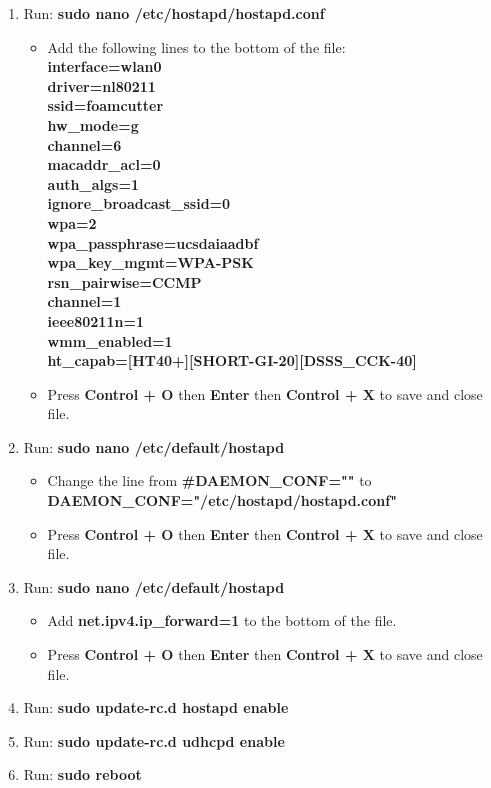 \documentclass[titlepage,12pt,letter]{report}
\numberwithin{equation}{chapter}
\begin{document}
\begin{enumerate}[itemsep = 5pt,topsep=0pt]
	\item Run: \textbf{sudo nano /etc/hostapd/hostapd.conf}
	\begin{itemize}[noitemsep,topsep=0pt]
		\item Add the following lines to the bottom of the file:\\
		\textbf{interface=wlan0} \\
		\textbf{driver=nl80211}\\
		\textbf{ssid=foamcutter}\\
		\textbf{hw\_mode=g}\\
		\textbf{channel=6}\\
		\textbf{macaddr\_acl=0}\\
		\textbf{auth\_algs=1}\\
		\textbf{ignore\_broadcast\_ssid=0}\\
		\textbf{wpa=2}\\
		\textbf{wpa\_passphrase=ucsdaiaadbf}\\
		\textbf{wpa\_key\_mgmt=WPA-PSK} \\   
		\textbf{rsn\_pairwise=CCMP}\\
		
		\textbf{channel=1}\\
		\textbf{ieee80211n=1}    \\     
		\textbf{wmm\_enabled=1}    \\ 
		\textbf{ht\_capab=[HT40+][SHORT-GI-20][DSSS\_CCK-40]}
		\item Press \textbf{Control + O} then \textbf{Enter} then \textbf{Control + X} to save and close file.
	\end{itemize}

	\item Run: \textbf{sudo nano /etc/default/hostapd}
	\begin{itemize}[noitemsep,topsep=0pt]
		\item Change the line from \textbf{\#DAEMON\_CONF=""} to \\ \textbf{DAEMON\_CONF="/etc/hostapd/hostapd.conf"}
		\item Press \textbf{Control + O} then \textbf{Enter} then \textbf{Control + X} to save and close file.
	\end{itemize}

	\item Run: \textbf{sudo nano /etc/default/hostapd}
	\begin{itemize}[noitemsep,topsep=0pt]
		\item Add \textbf{net.ipv4.ip\_forward=1} to the bottom of the file.
		\item Press \textbf{Control + O} then \textbf{Enter} then \textbf{Control + X} to save and close file.
	\end{itemize}

	\item Run: \textbf{sudo update-rc.d hostapd enable}
	\item Run: \textbf{sudo update-rc.d udhcpd enable}
	\item Run: \textbf{sudo reboot}	
\end{enumerate}
\end{document}
